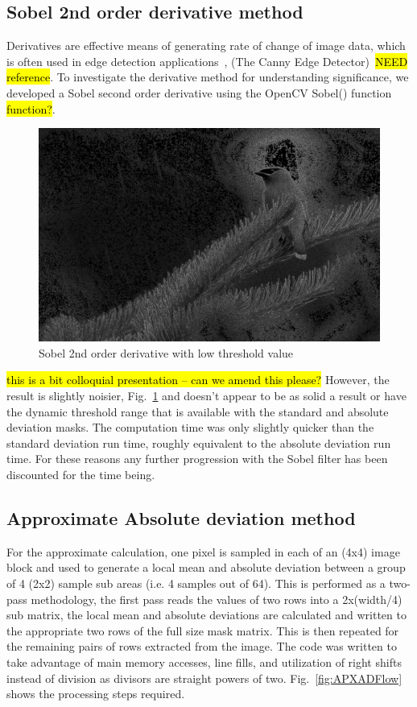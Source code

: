 \documentclass[journal]{IEEEtran}
\begin{document}
\subsection{Sobel 2nd order derivative method}
Derivatives are effective means of generating rate of change of image data, which is often used in edge detection applications~\cite{Canny1986}, \cite{Bradski2008} (The Canny Edge Detector)~\hl{NEED reference}. To investigate the derivative method for understanding significance, we developed a Sobel second order derivative using the OpenCV Sobel() function \hl{function?}. 
\begin{figure}[htbp]
  \centering
    \includegraphics[width=0.8
    \columnwidth]{CedarWaxSobel.jpg}
    \caption{Sobel 2nd order derivative with low threshold value}
  \label{fig:SobelDev}
\end{figure}

\hl{this is a bit colloquial presentation -- can we amend this please?} However, the result is slightly noisier, Fig.~\ref{fig:SobelDev} and doesn't appear to be as solid a result or have the dynamic threshold range that is available with the standard and absolute deviation masks. The computation time was only slightly quicker than the standard deviation run time, roughly equivalent to the absolute deviation run time. For these reasons any further progression with the Sobel filter has been discounted for the time being.


\subsection{Approximate Absolute deviation method}
For the approximate calculation, one pixel is sampled in each of an (4x4) image block and used to generate a local mean and absolute deviation between a group of 4 (2x2) sample sub areas (i.e. 4 samples out of 64). This is performed as a two-pass methodology, the first pass reads the values of two rows into a 2x(width/4) sub matrix, the local mean and absolute deviations are calculated and written to the appropriate two rows of the full size mask matrix. This is then repeated for the remaining pairs of rows extracted from the image. The code was written to take advantage of main memory accesses, line fills, and utilization of right shifts instead of division as divisors are straight powers of two. Fig.~\ref{fig:APXADFlow} shows the processing steps required.
\end{document}

